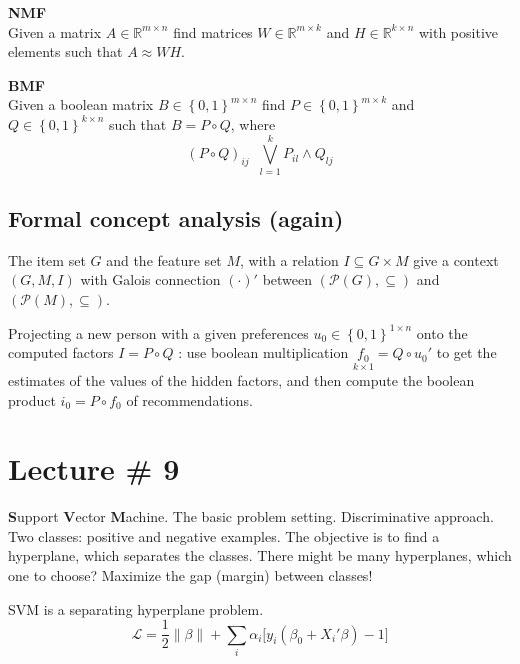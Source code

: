\documentclass[a4paper]{article}
\newcommand{\obj}[1]{{\left\{ #1 \right \}}}
\newcommand{\nrm}[1]{{\left\| #1 \right \|}}
\newcommand{\Real}{\mathbb{R}}
\newcommand{\Lcal}{\mathcal{L}}
\newcommand{\defn}{\mathop{\overset{\Delta}{=}}\nolimits}
\begin{document}
\noindent\textbf{NMF}\hfill \\
Given a matrix $A\in \Real^{m\times n}$ find matrices $W\in \Real^{m\times k}$ and
$H\in \Real^{k\times n}$ with positive elements such that $A\approx W H$.

\noindent\textbf{BMF}\hfill \\
Given a boolean matrix $B\in \obj{0,1}^{m\times n}$ find $P\in \obj{0,1}^{m\times k}$ and
$Q\in \obj{0,1}^{k\times n}$ such that $B = P\circ Q$, where 
\[(P \circ Q)_{ij} \defn \bigvee_{l=1}^k P_{il}\wedge Q_{lj} \]


\subsection{Formal concept analysis (again)} %
\label{sub:formal_concept_analysis}

The item set $G$ and the feature set $M$, with a relation $I\subseteq G\times M$
give a context $(G,M,I)$ with Galois connection $(\cdot)'$ between $(\mathcal{P}(G),\subseteq)$ and $(\mathcal{P}(M),\subseteq)$.



Projecting a new person with a given preferences $u_0\in \obj{0,1}^{1\times n}$ onto the computed factors $I=P\circ Q$ : 
use boolean multiplication $\underset{k\times 1}{f_0} = Q \circ u_0'$ to get the estimates of the values of the hidden
factors, and then compute the boolean product $i_0 = P\circ f_0$ of recommendations.




\section{Lecture \# 9} %
\label{sec:lecture_9}

\textbf{S}upport \textbf{V}ector \textbf{M}achine.
The basic problem setting. Discriminative approach.
Two classes: positive and negative examples. The objective is to find a hyperplane, which separates the classes.
There might be many hyperplanes, which one to choose? Maximize the gap (margin) between classes!

SVM is a separating hyperplane problem.
\[\Lcal = \frac{1}{2}\nrm{\beta} + \sum_i \alpha_i \big[y_i(\beta_0 + X_i'\beta) - 1\big]\]
\end{document}
